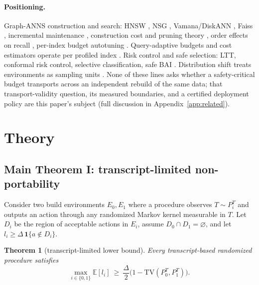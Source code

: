 \documentclass{article}
\newtheorem{theorem}{Theorem}
\newcommand{\TV}{\mathrm{TV}}
\newcommand{\E}{\mathbb{E}}
\begin{document}
\paragraph{Positioning.}
Graph-ANNS construction and search: HNSW \citep{malkov2020hnsw}, NSG \citep{fu2019nsg},
Vamana/DiskANN \citep{subramanya2019diskann}, Faiss \citep{johnson2021faiss}, incremental maintenance
\citep{xu2022maintenance}, construction cost and pruning theory \citep{prokhorenkova2020graph}, order
effects on recall \citep{elliott2024order}, per-index budget autotuning \citep{bae2026qbat}.
Query-adaptive budgets and cost estimators operate per profiled index
\citep{li2020learned,chatzakis2025darth,horchidan2025conann,wang2026annie,zhang2026exploration}. Risk
control and safe selection: LTT, conformal risk control, selective classification, safe BAI
\citep{angelopoulos2025ltt,bates2021rcps,angelopoulos2024crc,elyaniv2010selective,wang2022safebai,garivier2016bai}.
Distribution shift treats environments as sampling units
\citep{bendavid2010theory,johansson2019support,duchi2025multienv}. None of these lines asks whether a
safety-critical budget transports across an independent rebuild of the same data; that transport-validity
question, its measured boundaries, and a certified deployment policy are this paper's subject (full
discussion in Appendix~\ref{app:related}).

\section{Theory}
\label{sec:theory}

\subsection{Main Theorem I: transcript-limited non-portability}

Consider two build environments $E_0,E_1$ where a procedure observes $T\sim P_i^{T}$ and outputs an
action through any randomized Markov kernel measurable in $T$. Let $D_i$ be the region of acceptable
actions in $E_i$, assume $D_0\cap D_1=\varnothing$, and let $l_i\ge\Delta\,\mathbf{1}\{a\notin D_i\}$.

\begin{theorem}[transcript-limited lower bound]
Every transcript-based randomized procedure satisfies
\begin{equation}
\max_{i\in\{0,1\}}\E[l_{i}]\ \ge\ \frac{\Delta}{2}\bigl(1-\TV(P_{0}^{T},P_{1}^{T})\bigr).
\label{eq:thm1}
\end{equation}
\end{theorem}
\end{document}
